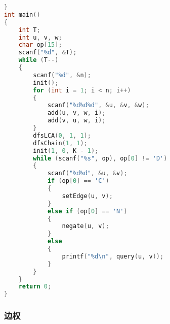 \begin{lstlisting}[language=c++]
}
int main()
{
    int T;
    int u, v, w;
    char op[15];
    scanf("%d", &T);
    while (T--)
    {
        scanf("%d", &n);
        init();
        for (int i = 1; i < n; i++)
        {
            scanf("%d%d%d", &u, &v, &w);
            add(u, v, w, i);
            add(v, u, w, i);
        }
        dfsLCA(0, 1, 1);
        dfsChain(1, 1);
        init(1, 0, K - 1);
        while (scanf("%s", op), op[0] != 'D')
        {
            scanf("%d%d", &u, &v);
            if (op[0] == 'C')
            {
                setEdge(u, v);
            }
            else if (op[0] == 'N')
            {
                negate(u, v);
            }
            else
            {
                printf("%d\n", query(u, v));
            }
        }
    }
    return 0;
}
	\end{lstlisting}
    \subsubsection{边权}
